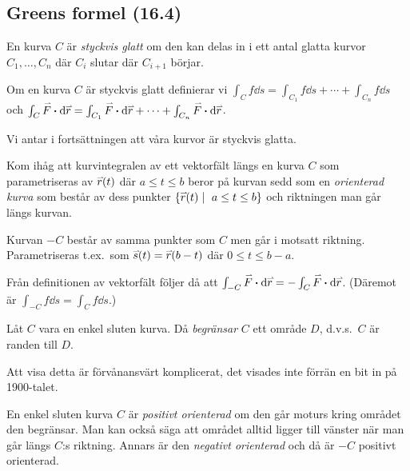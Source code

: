 \documentclass[a4paper]{article}
\begin{document}
\subsection{Greens formel (16.4)}
\begin{defn}
    En kurva \(
        C
    \) är \emph{styckvis glatt} om den kan delas in i ett antal glatta kurvor \(
        C_1, \dots, C_n
    \) där \(
        C_i 
    \) slutar där \(
        C_{i+1}
    \) börjar. 
\end{defn}

\begin{defn}
    Om en kurva \(
        C
    \) är styckvis glatt definierar vi \(
        \int_C f \dd s = \int_{C_1} f \dd s + \cdots + \int_{C_n} f \dd s
    \) och \(
        \int_C \accentset{\rightharpoonup}{F} \boldsymbol{\cdot} \dd \accentset{\rightharpoonup}{r} = \int_{C_1} \accentset{\rightharpoonup}{F} \boldsymbol{\cdot} \dd \accentset{\rightharpoonup}{r} + \cdots + \int_{C_n} \accentset{\rightharpoonup}{F} \boldsymbol{\cdot} \dd \accentset{\rightharpoonup}{r} 
    \).
\end{defn}

Vi antar i fortsättningen att våra kurvor är styckvis glatta. 

Kom ihåg att kurvintegralen av ett vektorfält längs en kurva \(
    C
\) som parametriseras av \(
    \accentset{\rightharpoonup}{r}(t)
\) där \(
    a \leq t \leq b
\) beror på kurvan sedd som en \emph{orienterad kurva} som består av dess punkter 
\(
    \{ \ver(t) \; | \; a \leq t \leq b \}
\) och riktningen man går längs kurvan. 
\begin{defn}
    Kurvan \(
        -C
    \) består av samma punkter som \(
        C
    \) men går i motsatt riktning. Parametriseras t.ex.\ som \(
        \accentset{\rightharpoonup}{s}(t) = \accentset{\rightharpoonup}{r}(b-t) 
    \) där \(
        0 \leq t \leq b-a
    \).
\end{defn}

Från definitionen av vektorfält följer då att \(
    \int_{-C} \accentset{\rightharpoonup}{F} \boldsymbol{\cdot} \dd \accentset{\rightharpoonup}{r} = - \int_C \accentset{\rightharpoonup}{F} \boldsymbol{\cdot} \dd \accentset{\rightharpoonup}{r}
\). (Däremot är \(
    \int_{-C} f \dd s = \int_C f \dd s
\).)

\begin{defn}
    Låt \(
        C
    \) vara en enkel sluten kurva. Då \emph{begränsar} \(
        C
    \) ett område \(
        D
    \), d.v.s.\ \(
        C
    \) är randen till \(
        D
    \).

    Att visa detta är förvånansvärt komplicerat, det visades inte förrän en bit in
    på 1900-talet.
\end{defn}

\begin{defn}
    En enkel sluten kurva \(
        C
    \) är \emph{positivt orienterad} om den går moturs kring området den begränsar.
    Man kan också säga att området alltid ligger till vänster när man går längs
    \(
        C
    \):s riktning. Annars är den \emph{negativt orienterad} och då är \(
        -C
    \) positivt orienterad.
\end{defn}
\end{document}
